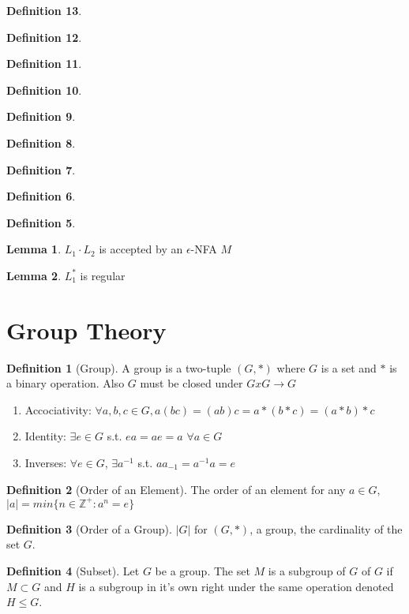 \documentclass{article}
\theoremstyle{definition}
\newtheorem{define}{Definition}[section]
\newtheorem{lem}{Lemma}[section]
\begin{document}
\begin{define}
\begin{define}
\begin{define}
\begin{define}
\begin{define}
\begin{define}
\begin{define}
\begin{define}
\begin{define}
\begin{lem}
$L_1\cdot L_2$ is accepted by an $\epsilon$-NFA $M$
\end{lem}

\begin{lem}
$L_1^*$ is regular
\end{lem}

\section{Group Theory}

\begin{define}[Group]
A group is a two-tuple $(G,*)$ where $G$ is a set and $*$ is a binary operation. Also $G$ must be closed under $GxG\rightarrow G$
	\begin{enumerate}
		\item Accociativity: $\forall a,b,c \in G, a(bc) = (ab)c=a*(b*c)=(a*b)*c$
		\item Identity: $\exists e \in G$ s.t. $ea=ae=a$ $\forall a \in G$
		\item Inverses: $\forall e \in G$, $\exists a^{-1}$ s.t. $aa_{-1}= a^{-1}a =e$
	\end{enumerate}
\end{define} 

\begin{define}[Order of an Element]
The order of an element for any $a \in G$, $|a| = min\{n\in \mathbb{Z}^+: a^n=e\}$
\end{define}

\begin{define}[Order of a Group]
$|G|$ for $(G,*)$, a group, the cardinality of the set $G$.
\end{define}

\begin{define}[Subset]
Let $G$ be a group. The set $M$ is a subgroup of $G$ of $G$ if $M\subset G$ and $H$ is a subgroup in it's own right under the same operation denoted $H \leq G$.
\end{define}


\end{define}
\end{define}
\end{define}
\end{define}
\end{define}
\end{define}
\end{define}
\end{define}
\end{define}
\end{document}

